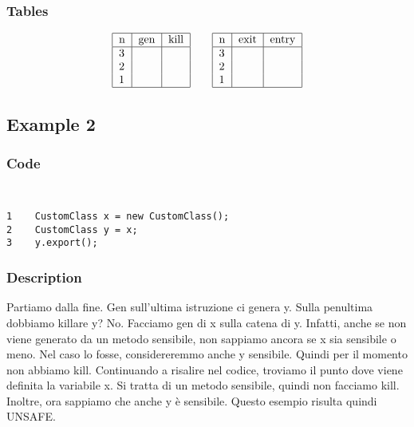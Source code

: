 \documentclass[letterpaper,twocolumn,10pt]{article}
\begin{document}
\subsubsection{Tables}
\begin{align*}
\begin{tabular}{|l|*{2}{c|}}
  \hline
  n & gen & kill  \\
  \hline 
  3 &  & \\ 
  2 &  &\\
  1 &  & \\
  \hline
\end{tabular}
\qquad
\begin{tabular}{|l|*{2}{c|}}
  \hline
  n & exit & entry  \\
  \hline 
  3 &  & \\ 
  2 &  &\\
  1 &  & \\
  \hline
\end{tabular}
\end{align*}

\subsection{Example 2}

\subsubsection{Code}
{\tt \small
\begin{verbatim}
1    CustomClass x = new CustomClass();
2    CustomClass y = x;
3    y.export();
\end{verbatim}
}

\subsubsection{Description}

Partiamo dalla fine. Gen sull'ultima istruzione ci genera y. Sulla penultima dobbiamo killare y? No. Facciamo gen di x sulla catena di y. Infatti, anche se non viene generato da un metodo sensibile, non sappiamo ancora se x sia sensibile o meno. Nel caso lo fosse, considereremmo anche y sensibile. Quindi per il momento non abbiamo kill. Continuando a risalire nel codice, troviamo il punto dove viene definita la variabile x. Si tratta di un metodo sensibile, quindi non facciamo kill. Inoltre, ora sappiamo che anche y \`e sensibile. Questo esempio risulta quindi UNSAFE.\\
\end{document}
